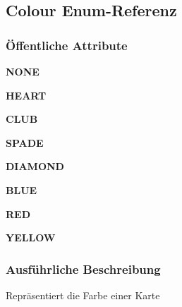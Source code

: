 \hypertarget{a00058}{\subsection{Colour Enum-\/\-Referenz}
\label{a00058}
}
\subsubsection*{Öffentliche Attribute}
\begin{DoxyCompactItemize}
\item 
\hypertarget{a00058_a899caa602e4fff675b17cdbab33607ec}{{\bfseries N\-O\-N\-E}}\label{a00058_a899caa602e4fff675b17cdbab33607ec}

\item 
\hypertarget{a00058_a3180b5ddc6dff3d52c4832ec6de840e4}{{\bfseries H\-E\-A\-R\-T}}\label{a00058_a3180b5ddc6dff3d52c4832ec6de840e4}

\item 
\hypertarget{a00058_a77a2fe3e4609d84c84f57d7d46cb1bbc}{{\bfseries C\-L\-U\-B}}\label{a00058_a77a2fe3e4609d84c84f57d7d46cb1bbc}

\item 
\hypertarget{a00058_a4352860c459e5f6750e877921a68d562}{{\bfseries S\-P\-A\-D\-E}}\label{a00058_a4352860c459e5f6750e877921a68d562}

\item 
\hypertarget{a00058_ae6d42ccdd43499d3bed82dbe21b24b73}{{\bfseries D\-I\-A\-M\-O\-N\-D}}\label{a00058_ae6d42ccdd43499d3bed82dbe21b24b73}

\item 
\hypertarget{a00058_a6b317f511e4605122591a00ca0fb1659}{{\bfseries B\-L\-U\-E}}\label{a00058_a6b317f511e4605122591a00ca0fb1659}

\item 
\hypertarget{a00058_a2fa22bc5317cd6f6690f2528eaf84400}{{\bfseries R\-E\-D}}\label{a00058_a2fa22bc5317cd6f6690f2528eaf84400}

\item 
\hypertarget{a00058_acc0f8b95413215f98df66ebfdebceb5b}{{\bfseries Y\-E\-L\-L\-O\-W}}\label{a00058_acc0f8b95413215f98df66ebfdebceb5b}

\end{DoxyCompactItemize}


\subsubsection{Ausführliche Beschreibung}
Repräsentiert die Farbe einer Karte 